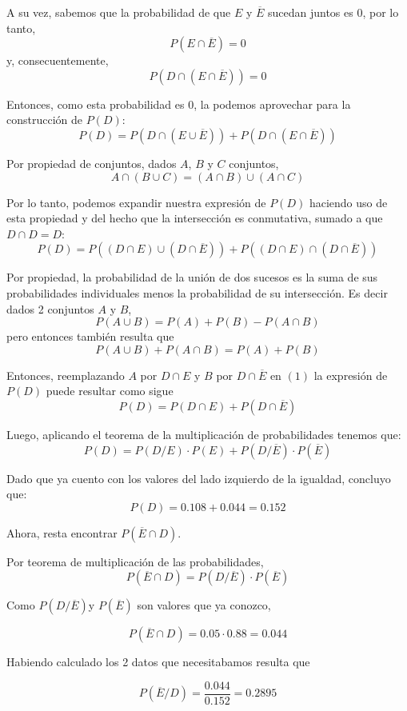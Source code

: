 \documentclass[11pt]{article}
\begin{document}
A su vez, sabemos que la probabilidad de que $E$ y $\overline{E}$ sucedan juntos es $0$, por lo tanto, 
\[P(E\cap \overline{E}) = 0\] y, consecuentemente, \[P(D\cap (E \cap \overline{E})) = 0\] 

Entonces, como esta probabilidad es $0$, la podemos aprovechar para la construcci\'on de $P(D)$: 
\[P(D) = P(D \cap (E \cup \overline{E})) + P(D\cap (E \cap \overline{E}))\]

Por propiedad de conjuntos, dados $A$, $B$ y $C$ conjuntos, 
\[A \cap (B\cup C) = (A\cap B) \cup (A\cap C)\]

Por lo tanto, podemos expandir nuestra expresi\'on de $P(D)$ haciendo uso de esta propiedad y del hecho que la intersecci\'on es conmutativa, sumado a que $D\cap D = D$: 
\[P(D) = P((D \cap E) \cup (D \cap \overline{E})) + P((D\cap E) \cap (D \cap \overline{E}))\]

Por propiedad, la probabilidad de la uni\'on de dos sucesos es la suma de sus probabilidades individuales menos la probabilidad de su intersecci\'on. Es decir dados 2 conjuntos $A$ y $B$, 
\[P(A\cup B)= P(A)+P(B)-P(A \cap B)\]
pero entonces tambi\'en resulta que 
\begin{equation}
P(A\cup B) + P(A\cap B) = P(A) + P(B)
\end{equation}

Entonces, reemplazando $A$ por $D\cap E$ y $B$ por $D\cap \overline{E}$ en $(1)$ la expresi\'on de $P(D)$ puede resultar como sigue
\[P(D) = P(D\cap E) + P(D\cap \overline{E})\]

Luego, aplicando el teorema de la multiplicaci\'on de
probabilidades tenemos que: 
\[P(D) = P(D/E)\cdot P(E) + P(D/\overline{E}) \cdot P(\overline{E})\]

Dado que ya cuento con los valores del lado izquierdo de la igualdad, concluyo que: 
\[P(D) = 0.108 + 0.044 = 0.152\]

Ahora, resta encontrar $P(\overline{E}\cap D)$. 

Por teorema de multiplicaci\'on de las probabilidades, 
\[P(\overline{E}\cap D) = P(D/\overline{E})\cdot P(\overline{E})\]

Como $P(D/\overline{E})$y $P(\overline{E})$ son valores que ya conozco, 

\[P(\overline{E}\cap D) = 0.05 \cdot 0.88 = 0.044\] 

Habiendo calculado los 2 datos que necesitabamos resulta que 

\[P(\overline{E}/D) = \frac{0.044}{0.152} = 0.2895\]


\end{document}
